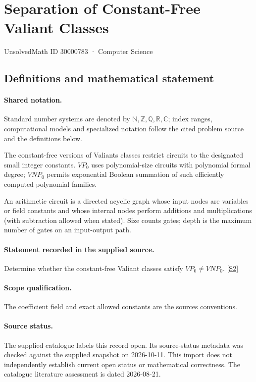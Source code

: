 \documentclass[11pt]{article}
\newcommand{\sref}[2]{\hyperlink{source:#1:#2}{[S#2]}}
\begin{document}
\setcounter{section}{30000782}
\section{Separation of Constant-Free Valiant Classes}\label{30000783}
{\small\sffamily UnsolvedMath ID 30000783 · Computer Science}
\subsection{Definitions and mathematical statement}

\paragraph{Shared notation.}Standard number systems are denoted by $\mathbb N,\mathbb Z,\mathbb Q,\mathbb R,\mathbb C$; index ranges, computational models and specialized notation follow the cited problem source and the definitions below.


The constant-free versions of Valiant\textquotesingle s classes restrict circuits to the designated small integer constants. $VP_0$ uses polynomial-size circuits with polynomial formal degree; $VNP_0$ permits exponential Boolean summation of such efficiently computed polynomial families.

An arithmetic circuit is a directed acyclic graph whose input nodes are variables or field constants and whose internal nodes perform additions and multiplications (with subtraction allowed when stated). Size counts gates; depth is the maximum number of gates on an input-output path.
\paragraph{Statement recorded in the supplied source.}
Determine whether the constant-free Valiant classes satisfy $VP_0\neq VNP_0$. \sref{30000783}{2}
\paragraph{Scope qualification.}
The coefficient field and exact allowed constants are the source\textquotesingle s conventions.
\paragraph{Source status.}
The supplied catalogue labels this record open. Its source-status metadata was checked against the supplied snapshot on 2026-10-11. This import does not independently establish current open status or mathematical correctness. The catalogue literature assessment is dated 2026-08-21.
\end{document}
